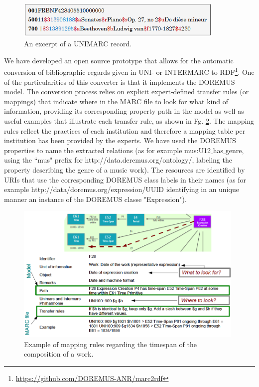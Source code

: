 \documentclass[runningheads,a4paper]{llncs}
\begin{document}
\begin{figure}
  \centering
  \includegraphics[width=10cm]{img/marc-exmpl-simple.png}
  \caption{An excerpt of a UNIMARC record.}
  \label{fig:unimarc}
\end{figure}

We have developed an open source prototype that allows for the automatic conversion of bibliographic regards given in UNI- or INTERMARC to RDF\footnote{\url{https://github.com/DOREMUS-ANR/marc2rdf}}. One of the particularities of this converter is that it implements the DOREMUS model. The conversion process relies on explicit expert-defined transfer rules (or mappings) that indicate where in the MARC file to look for what kind of information, providing its corresponding property path in the model as well as useful examples that illustrate each transfer rule, as shown in Fg. \ref{fig:mappings}. The mapping rules reflect the practices of each institution and therefore a mapping table per institution has been provided by the experts. We have used the DOREMUS properties to name the extracted relations (as for example mus:U12$\_$has$\_$genre, using the ``mus" prefix for http://data.deremus.org/ontology/, labeling the property describing the genre of a music work). The resources are identified by URIs that use the corresponding DOREMUS class labels in their names (as for example http://data/doremus.org/expression/UUID identifying in an unique manner an instance of the DOREMUS classe "Expression"). 

\begin{figure}
  \centering
  \includegraphics[width=11cm]{img/mapping-rules.png}
  \caption{Example of mapping rules regarding the timespan of the composition of a work.}
  \label{fig:mappings}
\end{figure}
\end{document}
